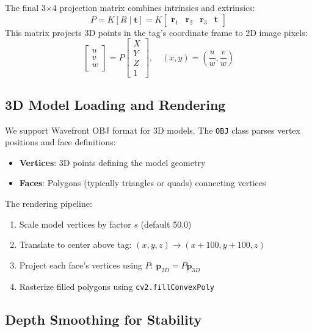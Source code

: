 \documentclass[9pt,a4paper,twocolumn,twoside]{tau-class/tau}
\begin{document}
    The final 3×4 projection matrix combines intrinsics and extrinsics:
    \begin{equation}
        P = K [R \mid \mathbf{t}] = K \begin{bmatrix} \mathbf{r}_1 & \mathbf{r}_2 & \mathbf{r}_3 & \mathbf{t} \end{bmatrix}
    \end{equation}
    This matrix projects 3D points in the tag's coordinate frame to 2D image pixels:
    \begin{equation}
        \begin{bmatrix} u \\ v \\ w \end{bmatrix} = P \begin{bmatrix} X \\ Y \\ Z \\ 1 \end{bmatrix}, \quad (x, y) = \left(\frac{u}{w}, \frac{v}{w}\right)
    \end{equation}

    \subsection{3D Model Loading and Rendering}

    We support Wavefront OBJ format for 3D models. The \texttt{OBJ} class parses vertex positions and face definitions:
    \begin{itemize}
        \item \textbf{Vertices}: 3D points defining the model geometry
        \item \textbf{Faces}: Polygons (typically triangles or quads) connecting vertices
    \end{itemize}

    The rendering pipeline:
    \begin{enumerate}
        \item Scale model vertices by factor $s$ (default 50.0)
        \item Translate to center above tag: $(x, y, z) \rightarrow (x + 100, y + 100, z)$
        \item Project each face's vertices using $P$: $\mathbf{p}_{2D} = P \mathbf{p}_{3D}$
        \item Rasterize filled polygons using \texttt{cv2.fillConvexPoly}
    \end{enumerate}

    \subsection{Depth Smoothing for Stability}
\end{document}

